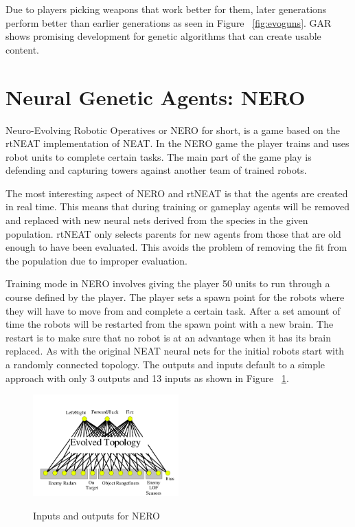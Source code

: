 \documentclass[12pt]{ucthesis} \newif\ifpdf \ifx\pdfoutput\undefined
\begin{document}
Due to players picking weapons that work better for them,
later generations perform better than earlier generations as seen in
Figure ~\ref{fig:evoguns}. GAR shows promising development for genetic algorithms that can create usable
content.

\section{Neural Genetic Agents: NERO}
  
Neuro-Evolving Robotic Operatives or NERO for short, is a game based on the
rtNEAT implementation of NEAT\cite{stanley:cig05}. In the NERO game the player
trains and uses robot units to complete certain tasks. The main part of the game play is
defending and capturing towers against another team of trained robots.

The most interesting aspect of NERO and rtNEAT is that the agents are created in
real time. This means that during training or gameplay agents will be removed
and replaced with new neural nets derived from the species in the given
population.
rtNEAT only selects parents for new agents from those that are old enough to
have been evaluated. This avoids the problem of removing the fit from the
population due to improper evaluation.

Training mode in NERO involves giving the player 50 units to run through a
course defined by the player. The player sets a spawn point for the robots where
they will have to move from and complete a certain task. After a set amount of
time the robots will be restarted from the spawn point with a new brain. The
restart is to make sure that no robot is at an advantage when it has its brain
replaced. As with the original NEAT neural nets for the initial robots start
with a randomly connected topology. The outputs and inputs default to a simple
approach with only 3 outputs and 13 inputs as shown in Figure ~\ref{fig:topology}.

\begin{figure}[h!] 
\caption{Inputs and outputs for NERO}
  \centering
    \includegraphics[width=0.5\textwidth]{topology.png}
   \label{fig:topology} 
\end{figure}
\end{document}
